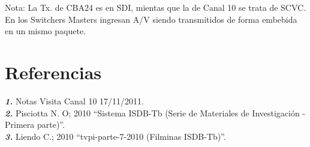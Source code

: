 \documentclass[a4paper,11pt]{article} %
\begin{document}
Nota: La Tx. de CBA24 es en SDI, mientas que la de Canal 10 se trata de
SCVC. En los Switchers Masters ingresan A/V siendo transmitidos de
forma embebida en un mismo paquete. 
 
\newpage
\section{Referencias}

\textbf{\emph{1.}} Notas Visita Canal 10 17/11/2011.
\\

\textbf{\emph{2.}} Pisciotta N. O; 2010 {``}Sistema ISDB-Tb
(Serie de Materiales de Investigaci\'on - Primera parte)''.
\\

\textbf{\emph{3.}} Liendo C.; 2010 {``}tvpi-parte-7-2010 (Filminas
ISDB-Tb)''.
\end{document}
